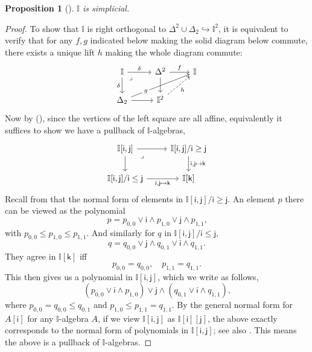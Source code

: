 \documentclass[a4paper,12pt]{amsart}
\newtheorem{proposition}[theorem]{Proposition}
\theoremstyle{definition}
\newcommand{\mbb}[1]{\mathbb{#1}}
\newcommand{\I}{\mbb I}
\newcommand{\ms}[1]{\mathsf{#1}}
\newcommand{\hook}{\hookrightarrow}
\begin{document}
\begin{proposition}[\AxiomSQCF]\label{specissimplicial}
  $\I$ is simplicial.
\end{proposition}
\begin{proof}
  To show that $\I$ is right orthogonal to $\Delta^2 \cup \Delta_2 \hook \I^2$, it is equivalent to verify that for any $f,g$ indicated below making the solid diagram below commute, there exists a unique lift $h$ making the whole diagram commute:
  \[\begin{tikzcd}
    \I \ar[r, "\delta"] \ar[d, "\delta"'] & \Delta^2 \ar[r, "f"] \ar[d] & \I \\
    \Delta_2 \ar[urr, "g"{description, near start}] \ar[r] & \I^2 \ar[ur, dashed, "h"']
    \arrow["\lrcorner"{anchor=center, pos=0.125}, draw=none, from=1-1, to=2-2]
  \end{tikzcd}\]
  Now by (\AxiomSQCF), since the vertices of the left square are all affine, equivalently it suffices to show we have a pullback of $\I$-algebras,
  \[\begin{tikzcd}
    {\I[\ms{i},\ms{j}]} \ar[r] \ar[d] & {\I[\ms{i},\ms{j}]/\ms{i} \ge \ms{j}} \ar[d, "{\ms{i},\ms{j} \mapsto\ms{k}}"] \\
    {\I[\ms{i},\ms{j}]/\ms{i} \le \ms{j}} \ar[r, "{\ms{i},\ms{j}\mapsto\ms{k}}"'] & {\I[\ms{k}]}
    \arrow["\lrcorner"{anchor=center, pos=0.125}, draw=none, from=1-1, to=2-2]
  \end{tikzcd}\]
  Recall from  that the normal form of elements in $\I[\ms{i},\ms{j}]/\ms{i}\ge \ms{j}$. An element $p$ there can be viewed as the polynomial 
  \[ p = p_{0,0} \vee \ms{i}\wedge p_{1,0} \vee \ms{j}\wedge p_{1,1}\text{,} \]
  with $p_{0,0} \le p_{1,0} \le p_{1,1}$. And similarly for $q$ in $\I[\ms{i},\ms{j}]/\ms{i} \le \ms{j}$, 
  \[ q = q_{0,0} \vee \ms{j} \wedge q_{0,1} \vee \ms{i} \wedge q_{1,1}\text{.} \]
  They agree in $\I[\ms{k}]$ iff 
  \[ p_{0,0} = q_{0,0}, \quad p_{1,1} = q_{1,1}\text{.} \]
  This then gives us a polynomial in $\I[\ms{i},\ms{j}]$, which we write as follows,
  \[ (p_{0,0} \vee \ms{i} \wedge p_{1,0}) \vee \ms{j} \wedge (q_{0,1} \vee \ms{i} \wedge q_{1,1})\text{,} \]
  where $p_{0,0} = q_{0,0} \le q_{0,1}$ and $p_{1,0} \le p_{1,1} = q_{1,1}$. 
  By the general normal form for $A[\ms{i}]$ for any $\I$-algebra $A$, if we view $\I[\ms{i},\ms{j}]$ as $\I[\ms{i}][\ms{j}]$, the above exactly corresponds to the normal form of polynomials in $\I[\ms{i},\ms{j}]$; see also \citet[Ch.\ 1, Thm.\ 10.21]{lausch2000algebra}. This means the above is a pullback of $\I$-algebras.
\end{proof}
\end{document}
